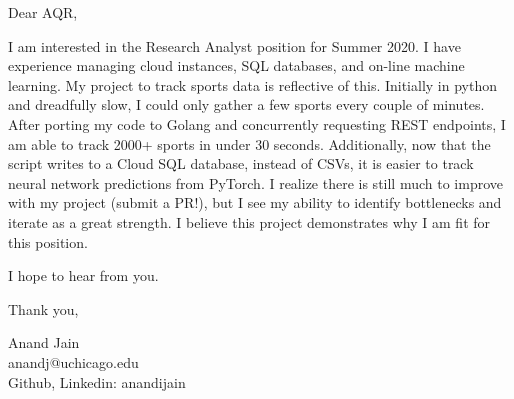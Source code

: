 \documentclass[11pt,a4paper]{letter} %
\begin{document}
Dear AQR,

I am interested in the Research Analyst position for Summer 2020.
I have experience managing cloud instances, SQL databases, and on-line machine learning.
My project to track sports data is reflective of this. 
Initially in python and dreadfully slow, I could only gather a few sports every couple of minutes.
After porting my code to Golang and concurrently requesting REST endpoints, I am able to track 2000+ sports in under 30 seconds.
Additionally, now that the script writes to a Cloud SQL database, instead of CSVs, it is easier to track neural network predictions from PyTorch.
I realize there is still much to improve with my project (submit a PR!), but I see my ability to identify bottlenecks and iterate as a great strength. 
I believe this project demonstrates why I am fit for this position.

I hope to hear from you.

Thank you, 

Anand Jain\\
anandj@uchicago.edu\\
Github, Linkedin: anandijain
\end{document}
